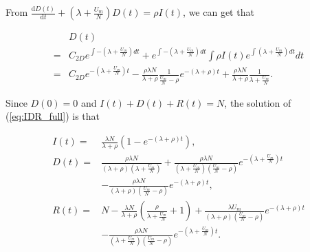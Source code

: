 From $\frac{\mathrm{d} D(t)}{\mathrm{d} t} + (\lambda + \frac{U_{m}}{N}) D(t)= \rho I(t)$,
we can get that
\begin{small}
\begin{equation}
\nonumber
\begin{aligned}
& D(t) \\
=& C_{2D} e^{\int -(\lambda + \frac{U_{m}}{N}) dt}
+ e^{\int -(\lambda + \frac{U_{m}}{N}) dt} \int \rho I(t) e^{\int (\lambda + \frac{U_{m}}{N}) dt} dt \\
=& C_{2D} e^{-(\lambda + \frac{U_{m}}{N})t}
- \frac{ \rho \lambda N }{ \lambda + \rho } \frac{1}{\frac{U_{m}}{N} - \rho} e^{-(\lambda + \rho)t}
+ \frac{ \rho \lambda N }{ \lambda + \rho } \frac{1}{\lambda + \frac{U_{m}}{N}}.
\end{aligned}
\end{equation}
\end{small}
Since $D(0) = 0$ and $I(t) + D(t) + R(t) = N$,
the solution of (\ref{eq:IDR_full}) is that
\begin{small}
\begin{equation}
\label{eq:IDR_full_solu}
\begin{aligned}
I(t) =& \frac{ \lambda N }{ \lambda + \rho }(1- e^{-(\lambda + \rho)t}),\\
D(t) =& \frac{ \rho \lambda N }{ (\lambda + \rho)(\lambda + \frac{U_{m}}{N}) }
+ \frac{\rho \lambda N}{(\lambda + \frac{U_{m}}{N})(\frac{U_{m}}{N} - \rho)}  e^{-(\lambda + \frac{U_{m}}{N})t}\\
& - \frac{ \rho \lambda N }{ (\lambda + \rho)(\frac{U_{m}}{N} - \rho) } e^{-(\lambda + \rho)t},\\
R(t) =& N - \frac{ \lambda N }{ \lambda + \rho } \left( \frac{\rho}{\lambda + \frac{U_{m}}{N}} + 1 \right)
+ \frac{ \lambda U_{m} }{ (\lambda + \rho)(\frac{U_{m}}{N} - \rho) } e^{-(\lambda + \rho)t}\\
& - \frac{\rho \lambda N}{(\lambda + \frac{U_{m}}{N})(\frac{U_{m}}{N} - \rho)}  e^{-(\lambda + \frac{U_{m}}{N})t}.
\end{aligned}
\end{equation}
\end{small}
